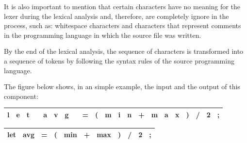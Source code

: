It is also important to mention that certain characters have no meaning for the lexer during the lexical analysis and, therefore, are completely ignore in the process, such as: whitespace characters and characters that represent comments in the programming language in which the source file was written.

By the end of the lexical analysis, the sequence of characters is transformed into a sequence of tokens by following the syntax rules of the source programming language.

The figure below shows, in an simple example, the input and the output of this component:

\newpage

\begin{table}[h!]
    \centering
    \begin{tabular}{|c|c|c|c|c|c|c|c|c|c|c|c|c|c|c|c|c|c|c|c|c|}
        \hline
        l & e & t &  & a & v & g &  & = & ( & m & i & n & + & m & a & x & ) & / & 2 & ; \\
        \hline
    \end{tabular}
\end{table}

\begin{figure}[h!]
  \centering
\end{figure}

\begin{table}[h!]
    \centering
    \begin{tabular}{|c|c|c|c|c|c|c|c|c|c|c|}
        \hline
        let & avg & = & ( & min & + & max & ) & / & 2 & ; \\
        \hline
    \end{tabular}
\end{table}


